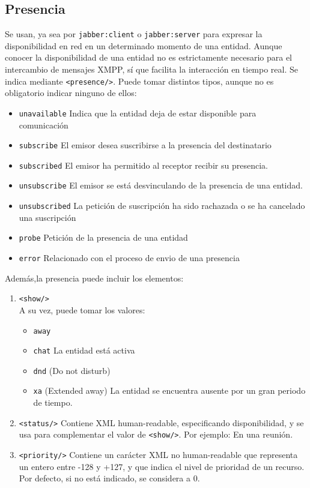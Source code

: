 \documentclass[a4paper, 11pt]{article} %
\begin{document}
  \subsection{Presencia}
    Se usan, ya sea por \texttt{jabber:client} o \texttt{jabber:server} para expresar la disponibilidad en red en un
    determinado momento de una entidad. Aunque conocer la disponibilidad de una entidad no es estrictamente
    necesario para el intercambio de mensajes XMPP, sí que facilita la interacción en tiempo real. Se indica 
    mediante \texttt{<presence/>}. Puede tomar distintos tipos, aunque no es obligatorio indicar ninguno de ellos:
    \begin{itemize}
     \item \texttt{unavailable} Indica que la entidad deja de estar disponible para comunicación
     \item \texttt{subscribe} El emisor desea suscribirse a la presencia del destinatario %
     \item \texttt{subscribed} El emisor ha permitido al receptor recibir su presencia.
     \item \texttt{unsubscribe} El emisor se está desvinculando de la presencia de una entidad.
     \item \texttt{unsubscribed} La petición de suscripción ha sido rachazada o se ha cancelado una suscripción
     \item \texttt{probe} Petición de la presencia de una entidad
     \item \texttt{error} Relacionado con el proceso de envio de una presencia
    \end{itemize}
    
    Además,la presencia puede incluir los elementos:
    \begin{enumerate}
     \item \texttt{<show/>}\\
     A su vez, puede tomar los valores:
     \begin{itemize}
      \item \texttt{away} 
      \item \texttt{chat} La entidad está activa
      \item \texttt{dnd} (Do not disturb)
      \item \texttt{xa} (Extended away) La entidad se encuentra ausente por un gran periodo de tiempo.
     \end{itemize}
     \item \texttt{<status/>}
     Contiene XML human-readable, especificando disponibilidad, y se usa para complementar el valor de \texttt{<show/>}.
     Por ejemplo: En una reunión.
     \item \texttt{<priority/>}
     Contiene un carácter XML no human-readable que representa un entero entre -128 y +127, y que indica el nivel
     de prioridad de un recurso. Por defecto, si no está indicado, se considera a 0.
    \end{enumerate}
\end{document}
